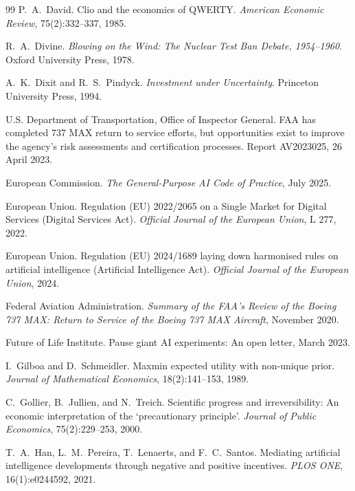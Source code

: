 \documentclass[11pt]{article}
\theoremstyle{plain}
\theoremstyle{definition}
\begin{document}
\begin{thebibliography}{99}
 P.~A.~David. Clio and the economics of QWERTY. \emph{American Economic Review}, 75(2):332--337, 1985.

 R.~A.~Divine. \emph{Blowing on the Wind: The Nuclear Test Ban Debate, 1954--1960}. Oxford University Press, 1978.

 A.~K.~Dixit and R.~S.~Pindyck. \emph{Investment under Uncertainty}. Princeton University Press, 1994.

 U.S. Department of Transportation, Office of Inspector General. FAA has completed 737 MAX return to service efforts, but opportunities exist to improve the agency's risk assessments and certification processes. Report AV2023025, 26 April 2023.

 European Commission. \emph{The General-Purpose AI Code of Practice}, July 2025.

 European Union. Regulation (EU) 2022/2065 on a Single Market for Digital Services (Digital Services Act). \emph{Official Journal of the European Union}, L 277, 2022.

 European Union. Regulation (EU) 2024/1689 laying down harmonised rules on artificial intelligence (Artificial Intelligence Act). \emph{Official Journal of the European Union}, 2024.

 Federal Aviation Administration. \emph{Summary of the FAA's Review of the Boeing 737 MAX: Return to Service of the Boeing 737 MAX Aircraft}, November 2020.

 Future of Life Institute. Pause giant AI experiments: An open letter, March 2023.

 I.~Gilboa and D.~Schmeidler. Maxmin expected utility with non-unique prior. \emph{Journal of Mathematical Economics}, 18(2):141--153, 1989.

 C.~Gollier, B.~Jullien, and N.~Treich. Scientific progress and irreversibility: An economic interpretation of the `precautionary principle'. \emph{Journal of Public Economics}, 75(2):229--253, 2000.

 T.~A.~Han, L.~M.~Pereira, T.~Lenaerts, and F.~C.~Santos. Mediating artificial intelligence developments through negative and positive incentives. \emph{PLOS ONE}, 16(1):e0244592, 2021.


\end{thebibliography}
\end{document}
